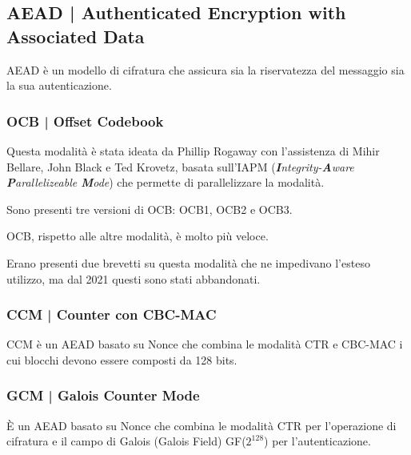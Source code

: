 \subsection{AEAD | Authenticated Encryption with Associated Data}


\textsf{\small AEAD è un modello di cifratura che assicura sia la riservatezza del messaggio sia la sua autenticazione.}

\subsubsection{OCB | Offset Codebook} %



\textsf{\small Questa modalità è stata ideata da Phillip Rogaway con l'assistenza di Mihir Bellare, John Black e Ted Krovetz, basata sull'IAPM (\emph{\textbf{I}ntegrity-\textbf{A}ware \textbf{P}arallelizeable \textbf{M}ode}) che permette di parallelizzare la modalità.}

\textsf{\small Sono presenti tre versioni di OCB: OCB1, OCB2 e OCB3.}


\textsf{\small OCB, rispetto alle altre modalità, è molto più veloce.}

\textsf{\small Erano presenti due brevetti su questa modalità che ne impedivano l'esteso utilizzo, ma dal 2021 questi sono stati abbandonati.} %

\subsubsection{CCM | Counter con CBC-MAC}

    

\textsf{\small CCM è un AEAD basato su Nonce che combina le modalità CTR e CBC-MAC i cui blocchi devono essere composti da 128 bits.}

\subsubsection{GCM | Galois Counter Mode}

      

\textsf{\small È un AEAD basato su Nonce che combina le modalità CTR per l'operazione di cifratura e il campo di Galois (Galois Field) GF($2^{128}$) per l'autenticazione.}

